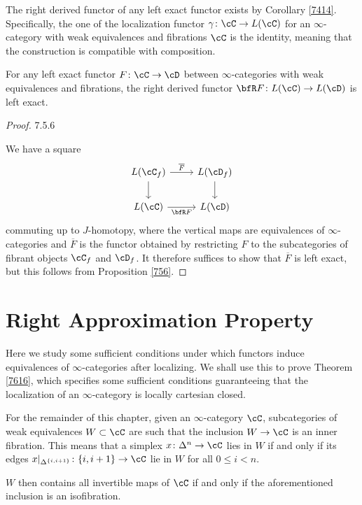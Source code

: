\begin{rmk}
  The right derived functor of any left exact functor exists by Corollary
  \ref{7414}. Specifically, the one of the localization functor
  $\gamma\colon\cC\rightarrow L(\cC)$ for an $\infty$-category with weak
  equivalences and fibrations $\cC$ is the identity, meaning that the
  construction is compatible with composition.
\end{rmk}

\begin{prop}\label{7528}

  For any left exact functor $F\colon\cC\rightarrow\cD$ between
  $\infty$-categories with weak equivalences and fibrations, the right derived
  functor $\bfR F\colon L(\cC)\rightarrow L(\cD)$ is left exact.
\end{prop}
\begin{proof}
  7.5.6

  We have a square
  \[\begin{tikzcd}
    {L(\cC_f)} & {L(\cD_f)} \\
    {L(\cC)} & {L(\cD)}
    \arrow["{\overline{F}}", from=1-1, to=1-2]
    \arrow[from=1-2, to=2-2]
    \arrow[from=1-1, to=2-1]
    \arrow["{\bfR F}"', from=2-1, to=2-2]
  \end{tikzcd}\]
  commuting up to $J$-homotopy, where the vertical maps are equivalences of
  $\infty$-categories and $\overline{F}$ is the functor obtained by restricting
  $F$ to the subcategories of fibrant objects $\cC_f$ and $\cD_f$. It therefore
  suffices to show that $\overline{F}$ is left exact, but this follows from
  Proposition \ref{756}.
\end{proof}

\section{Right Approximation Property}

Here we study some sufficient conditions under which functors induce
equivalences of $\infty$-categories after localizing. We shall use this to prove
Theorem \ref{7616}, which specifies some sufficient conditions guaranteeing that
the localization of an $\infty$-category is locally cartesian closed.

\begin{rmk}

  For the remainder of this chapter, given an $\infty$-category $\cC$,
  subcategories of weak equivalences $W\subset\cC$ are such that the inclusion
  $W\rightarrow\cC$ is an inner fibration. This means that a simplex
  $x\colon\Delta^n\rightarrow\cC$ lies in $W$ if and only if its edges
  $x|_{\Delta^{\{i,i+1\}}}\colon \{i,i+1\}\rightarrow\cC$ lie in $W$ for all
  $0\leq i<n$.

  \noindent
  $W$ then contains all invertible maps of $\cC$ if and only if the
  aforementioned inclusion is an isofibration.
\end{rmk}


